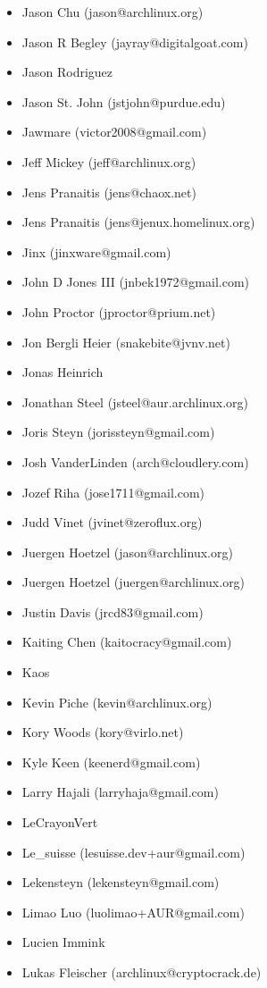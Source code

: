 \begin{itemize}
\item  Jason Chu (jason@archlinux.org)
\item  Jason R Begley (jayray@digitalgoat.com)
\item  Jason Rodriguez
\item  Jason St. John (jstjohn@purdue.edu)
\item  Jawmare (victor2008@gmail.com)
\item  Jeff Mickey (jeff@archlinux.org)
\item  Jens Pranaitis (jens@chaox.net)
\item  Jens Pranaitis (jens@jenux.homelinux.org)
\item  Jinx (jinxware@gmail.com)
\item  John D Jones III (jnbek1972@gmail.com)
\item  John Proctor (jproctor@prium.net)
\item  Jon Bergli Heier (snakebite@jvnv.net)
\item  Jonas Heinrich
\item  Jonathan Steel (jsteel@aur.archlinux.org)
\item  Joris Steyn (jorissteyn@gmail.com)
\item  Josh VanderLinden (arch@cloudlery.com)
\item  Jozef Riha (jose1711@gmail.com)
\item  Judd Vinet (jvinet@zeroflux.org)
\item  Juergen Hoetzel (jason@archlinux.org)
\item  Juergen Hoetzel (juergen@archlinux.org)
\item  Justin Davis (jrcd83@gmail.com)
\item  Kaiting Chen (kaitocracy@gmail.com)
\item  Kaos
\item  Kevin Piche (kevin@archlinux.org)
\item  Kory Woods (kory@virlo.net)
\item  Kyle Keen (keenerd@gmail.com)
\item  Larry Hajali (larryhaja@gmail.com)
\item  LeCrayonVert
\item  Le\_suisse (lesuisse.dev+aur@gmail.com)
\item  Lekensteyn (lekensteyn@gmail.com)
\item  Limao Luo (luolimao+AUR@gmail.com)
\item  Lucien Immink
\item  Lukas Fleischer (archlinux@cryptocrack.de)

\end{itemize}
